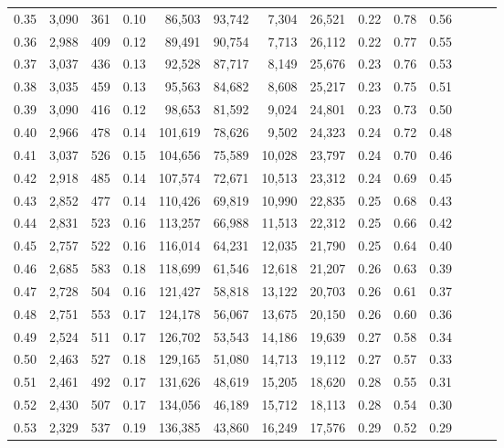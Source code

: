 \begin{tabular}{rrrrrrrrrrrrrr}
0.35 &  3,090 &    361 &  0.10 &   86,503 &   93,742 &   7,304 &  26,521 &  0.22 &  0.78 &      0.56 \\
0.36 &  2,988 &    409 &  0.12 &   89,491 &   90,754 &   7,713 &  26,112 &  0.22 &  0.77 &      0.55 \\
0.37 &  3,037 &    436 &  0.13 &   92,528 &   87,717 &   8,149 &  25,676 &  0.23 &  0.76 &      0.53 \\
0.38 &  3,035 &    459 &  0.13 &   95,563 &   84,682 &   8,608 &  25,217 &  0.23 &  0.75 &      0.51 \\
0.39 &  3,090 &    416 &  0.12 &   98,653 &   81,592 &   9,024 &  24,801 &  0.23 &  0.73 &      0.50 \\
0.40 &  2,966 &    478 &  0.14 &  101,619 &   78,626 &   9,502 &  24,323 &  0.24 &  0.72 &      0.48 \\
0.41 &  3,037 &    526 &  0.15 &  104,656 &   75,589 &  10,028 &  23,797 &  0.24 &  0.70 &      0.46 \\
0.42 &  2,918 &    485 &  0.14 &  107,574 &   72,671 &  10,513 &  23,312 &  0.24 &  0.69 &      0.45 \\
0.43 &  2,852 &    477 &  0.14 &  110,426 &   69,819 &  10,990 &  22,835 &  0.25 &  0.68 &      0.43 \\
0.44 &  2,831 &    523 &  0.16 &  113,257 &   66,988 &  11,513 &  22,312 &  0.25 &  0.66 &      0.42 \\
0.45 &  2,757 &    522 &  0.16 &  116,014 &   64,231 &  12,035 &  21,790 &  0.25 &  0.64 &      0.40 \\
0.46 &  2,685 &    583 &  0.18 &  118,699 &   61,546 &  12,618 &  21,207 &  0.26 &  0.63 &      0.39 \\
0.47 &  2,728 &    504 &  0.16 &  121,427 &   58,818 &  13,122 &  20,703 &  0.26 &  0.61 &      0.37 \\
0.48 &  2,751 &    553 &  0.17 &  124,178 &   56,067 &  13,675 &  20,150 &  0.26 &  0.60 &      0.36 \\
0.49 &  2,524 &    511 &  0.17 &  126,702 &   53,543 &  14,186 &  19,639 &  0.27 &  0.58 &      0.34 \\
0.50 &  2,463 &    527 &  0.18 &  129,165 &   51,080 &  14,713 &  19,112 &  0.27 &  0.57 &      0.33 \\
0.51 &  2,461 &    492 &  0.17 &  131,626 &   48,619 &  15,205 &  18,620 &  0.28 &  0.55 &      0.31 \\
0.52 &  2,430 &    507 &  0.17 &  134,056 &   46,189 &  15,712 &  18,113 &  0.28 &  0.54 &      0.30 \\
0.53 &  2,329 &    537 &  0.19 &  136,385 &   43,860 &  16,249 &  17,576 &  0.29 &  0.52 &      0.29 \\

\end{tabular}
